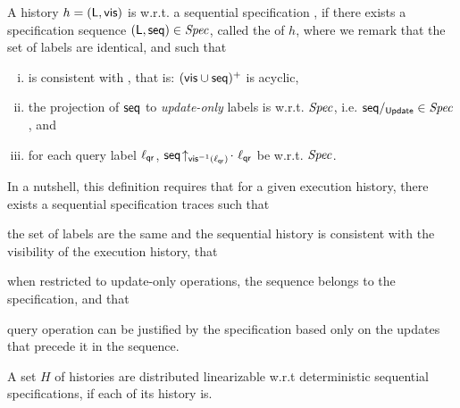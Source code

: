 \begin{definition}[\CRDTLin{}]
  \label{definition:distributed linearizability} A history $h =
  (\mathsf{L},\mathsf{vis})$ is \CRDTLin{} w.r.t. a 
   sequential specification
  \Spec{}, if there exists a specification sequence
  $(\mathsf{L}, \mathsf{seq}) \in \mathit{Spec}{}$, called the
  \crdtlinearization{} of $h$, where we remark that the set of labels
  are identical, and such that %
  \begin{enumerate}[(i)]
  \item \aseqord{} is consistent with  \avisord{}, that is: $(\mathsf{vis}
    \cup \mathsf{seq})^{+}$ is acyclic, 
  \item the projection of $\mathsf{seq}$ to \emph{update-only} labels is
    \hwlinearizable{} w.r.t. $\mathit{Spec}$, i.e. $\mathsf{seq}/_{\mathsf{Update}} \in \mathit{Spec}$, and 
  \item for each query label $\ell_{\mathsf{qr}}$,
    $\mathsf{seq}\!\uparrow_{\mathsf{vis}^{-1}(\ell_{\mathsf{qr}})}\!\cdot\
    \ell_{\mathsf{qr}}$ be \hwlinearizable{} w.r.t. $\mathit{Spec}$. 
\end{enumerate}

In a nutshell, this definition requires that for a given execution
history, there exists a sequential specification traces such
that
\begin{inparaenum}
\item the set of labels are the same and the sequential history is
  consistent with the visibility of the execution history, that
\item when restricted to update-only operations, the sequence belongs to
  the specification, and that
\item query operation can be justified by the specification based only
  on the updates that precede it in the sequence.
\end{inparaenum}

A set $H$ of histories are distributed linearizable w.r.t deterministic sequential specifications, if each of its history is.
\end{definition}


